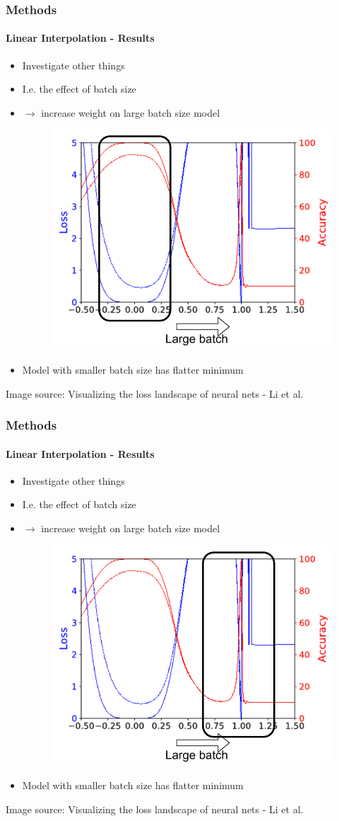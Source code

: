 \documentclass[9pt]{beamer}
\begin{document}
\begin{frame}
\frametitle{Methods}
\framesubtitle{Linear Interpolation - Results}
\begin{itemize}
	\item Investigate other things
	\item I.e. the effect of batch size
	\item $\rightarrow$ increase weight on large batch size model
	\begin{figure}
		\includegraphics[width=0.7\linewidth]{figures/batch_size_1.pdf}
	\end{figure}
\item Model with smaller batch size has flatter minimum
\end{itemize}
\tiny\color{lightgray}Image source: Visualizing the loss landscape of neural nets - Li et al.
\end{frame} 
\begin{frame}
\frametitle{Methods}
\framesubtitle{Linear Interpolation - Results}
\begin{itemize}
	\item Investigate other things
	\item I.e. the effect of batch size
	\item $\rightarrow$ increase weight on large batch size model
	\begin{figure}
		\includegraphics[width=0.7\linewidth]{figures/batch_size_2.pdf}
	\end{figure}
	\item Model with smaller batch size has flatter minimum
\end{itemize}
\tiny\color{lightgray}Image source: Visualizing the loss landscape of neural nets - Li et al.
\end{frame}
\end{document}
